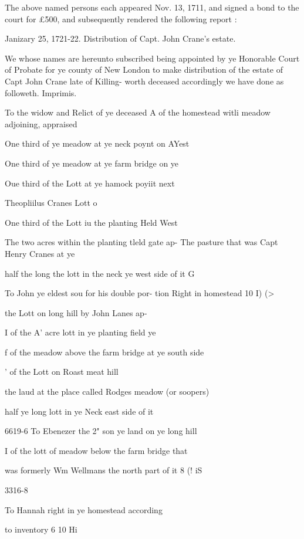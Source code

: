 \documentclass[oneside]{book}
\begin{document}
The above named persons each appeared Nov. 13, 1711, and 
signed a bond to the court for £500, and subsequently rendered 
the following report : 

Janizary 25, 1721-22. Distribution of Capt. John Crane's 
estate. 

We whose names are hereunto subscribed being appointed by 
ye Honorable Court of Probate for ye county of New London to 
make distribution of the estate of Capt John Crane late of Killing- 
worth deceased accordingly we have done as followeth. 
Imprimis. 

To the widow and Relict of ye deceased A of the 
homestead witli meadow adjoining, appraised 

One third of ye meadow at ye neck poynt on AYest 


One third of ye meadow at ye farm bridge on ye 





Oue third of the Lott at ye hamock poyiit next 

Theopliilus Cranes Lott o   

One third of the Lott iu the planting Held West 


The two acres within the planting tleld gate ap- 
The pasture that was Capt Henry Cranes at ye 


half the long the lott in the neck ye west side of it G   




To John ye eldest sou for his double por- 
tion Right in homestead 10  I)  (> 

the Lott on long hill by John Lanes ap- 

I of the A' acre lott in ye planting field ye 


f of the meadow above the farm bridge at 
ye south side 

' of the Lott on Roast meat hill 

the laud at the place called Rodges meadow 
(or soopers) 

half ye long lott in ye Neck east side of it 

6619-6 
To Ebenezer the 2" son ye land on ye long hill 


I of the lott of meadow below the farm bridge that 

was formerly Wm Wellmans the north part of it 8  (!  iS 


3316-8 

To Hannah right in ye homestead according 

to inventory 6  10  Hi 
\end{document}
